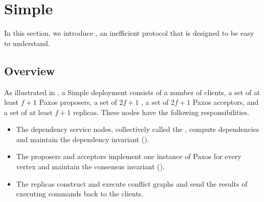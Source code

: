 \section{Simple \BPaxos{}}
In this section, we introduce , an inefficient
protocol that is designed to be easy to understand.

\subsection{Overview}
{}

As illustrated in , a Simple \BPaxos{} deployment consists
of a number of clients, a set of at least $f+1$ Paxos proposers, a set of
$2f+1$ , a set of $2f+1$ Paxos acceptors, and
a set of at least $f+1$ replicas. These nodes have the following responsibilities.
\begin{itemize}
  \item
    The dependency service nodes, collectively called the , compute dependencies and maintain the dependency invariant
    ().

  \item
    The proposers and acceptors implement one instance of Paxos for every
    vertex and maintain the consensus invariant ().

  \item
    The replicas construct and execute conflict graphs and send the results of
    executing commands back to the clients.
\end{itemize}

